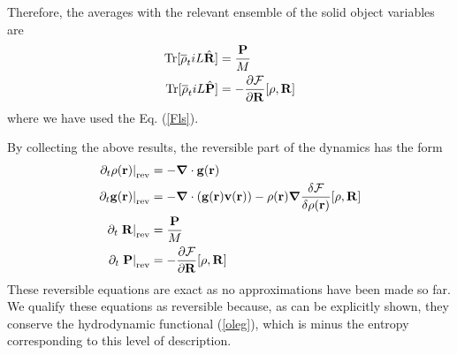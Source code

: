 \documentclass[a4paper,openright,12pt]{book}
\begin{document}
Therefore, the averages with the relevant ensemble of the solid object variables are
\begin{align}
{\rm Tr}[\overline{\rho}_t  iL\hat{\bf R}] 
&=\frac{\bf P}{M}
\nonumber\\
{\rm Tr}[\overline{\rho}_t  iL\hat{\bf P}] 
&=-\frac{\partial {\cal F}}{\partial {\bf R}}[\rho,{\bf R}]
\end{align}
where we have used the Eq. (\ref{Fls}).

By collecting the  above results, the reversible part  of the dynamics
has the form
\begin{align}
\left.  \partial_t\rho({\bf r})\right|_{\rm rev}&=-\boldsymbol{\nabla}\cdot{\bf g}({\bf r})
\nonumber\\
\left.  \partial_t{\bf g}({\bf r})\right|_{\rm rev}&=-\boldsymbol{\nabla}\cdot\left({\bf g}({\bf r}){\bf v}({\bf r})\right)
-\rho({\bf r})\boldsymbol{\nabla} \frac{\delta {\cal F}}{\delta\rho({\bf r})}[\rho,{\bf R}]
\nonumber\\
\partial_t\left. {\bf R}\right|_{\rm rev}&=\frac{\bf P}{M}
\nonumber\\
\partial_t\left.{\bf P}\right|_{\rm rev}&=-\frac{\partial {\cal F}}{\partial {\bf R}}[\rho,{\bf R}]
\label{rev}
\end{align}
These reversible  equations are exact  as no approximations  have been
made so far. We qualify these  equations as reversible because, as can
be  explicitly  shown,  they   conserve  the  hydrodynamic  functional
(\ref{oleg}), which  is minus the entropy corresponding
  to this level of description.
\end{document}
